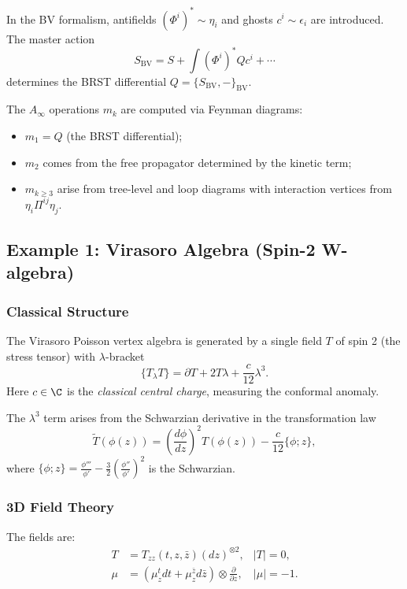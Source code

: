 In the BV formalism, antifields $(\Phi^i)^* \sim \eta_i$ and ghosts $c^i \sim \epsilon_i$ are introduced. The master action
\[
S_{\text{BV}} = S + \int (\Phi^i)^* Q c^i + \cdots
\]
determines the BRST differential $Q = \{S_{\text{BV}}, -\}_{\text{BV}}$.

The $A_\infty$ operations $m_k$ are computed via Feynman diagrams:
\begin{itemize}
\item $m_1 = Q$ (the BRST differential);
\item $m_2$ comes from the free propagator determined by the kinetic term;
\item $m_{k \geq 3}$ arise from tree-level and loop diagrams with interaction vertices from $\eta_i \Pi^{ij} \eta_j$.
\end{itemize}

\subsection{Example 1: Virasoro Algebra (Spin-2 W-algebra)}
\label{subsec:virasoro}

\subsubsection{Classical Structure}

The Virasoro Poisson vertex algebra is generated by a single field $T$ of spin 2 (the stress tensor) with $\lambda$-bracket
\begin{equation}
\label{eq:vir-lambda-bracket}
\{T_\lambda T\} = \partial T + 2T\lambda + \frac{c}{12}\lambda^3.
\end{equation}
Here $c \in \C$ is the \emph{classical central charge}, measuring the conformal anomaly.

\begin{remark}
The $\lambda^3$ term arises from the Schwarzian derivative in the transformation law
\[
\tilde{T}(\phi(z)) = \left(\frac{d\phi}{dz}\right)^2 T(\phi(z)) - \frac{c}{12}\{\phi; z\},
\]
where $\{\phi; z\} = \frac{\phi'''}{\phi'} - \frac{3}{2}\left(\frac{\phi''}{\phi'}\right)^2$ is the Schwarzian.
\end{remark}

\subsubsection{3D Field Theory}

The fields are:
\begin{align}
T &= T_{zz}(t,z,\bar{z}) (dz)^{\otimes 2}, & |T| = 0,\\
\mu &= (\mu^t_z dt + \mu^{\bar{z}}_z d\bar{z}) \otimes \frac{\partial}{\partial z}, & |\mu| = -1.
\end{align}

